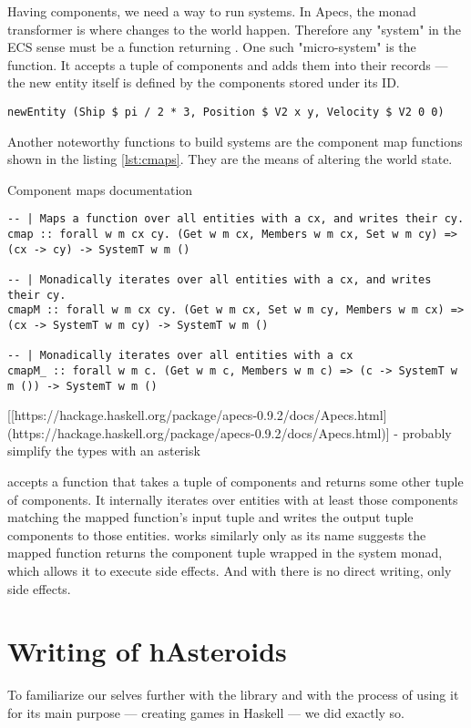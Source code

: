 \documentclass[
  digital, %
  color,   %
  table,   %
  oneside, %
  lof,     %
  lot,     %
]{fithesis3}
\begin{document}
Having components, we need a way to run systems. In Apecs,
the  monad transformer is where changes to the world happen.
Therefore any "system" in the ECS sense must be a function returning .
One such "micro-system" is the  function.
It accepts a tuple of components and adds them into
their records — the new entity itself is defined by the components stored under its ID.
\begin{verbatim}
newEntity (Ship $ pi / 2 * 3, Position $ V2 x y, Velocity $ V2 0 0)
\end{verbatim}
Another noteworthy functions to build systems are the component map functions
shown in the listing \ref{lst:cmaps}. They are the means of altering the world state.

\begin{listing}
\label{lst:cmaps}
\caption{Component maps documentation}
\begin{verbatim}
-- | Maps a function over all entities with a cx, and writes their cy.
cmap :: forall w m cx cy. (Get w m cx, Members w m cx, Set w m cy) => (cx -> cy) -> SystemT w m ()

-- | Monadically iterates over all entities with a cx, and writes their cy.
cmapM :: forall w m cx cy. (Get w m cx, Set w m cy, Members w m cx) => (cx -> SystemT w m cy) -> SystemT w m ()

-- | Monadically iterates over all entities with a cx
cmapM_ :: forall w m c. (Get w m c, Members w m c) => (c -> SystemT w m ()) -> SystemT w m ()
\end{verbatim}
\end{listing}

[[https://hackage.haskell.org/package/apecs-0.9.2/docs/Apecs.html](https://hackage.haskell.org/package/apecs-0.9.2/docs/Apecs.html)] - probably simplify the types with an asterisk

 accepts a function that takes a tuple of components
and returns some other tuple of components. It internally iterates
over entities with at least those components matching the mapped
function's input tuple and writes the output tuple components
to those entities.  works similarly
only as its name suggests the mapped function returns the component
tuple wrapped in the system monad, which allows it to execute side effects.
And with  there is no direct writing, only side effects.



\section{Writing of hAsteroids}
To familiarize our selves further with the library and with the process
of using it for its main purpose — creating games in Haskell — we did exactly so.
\end{document}
